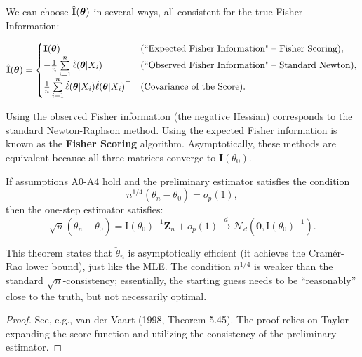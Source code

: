 We can choose $\hat{\mathbf{I}}(\boldsymbol{\boldsymbol{\theta}})$ in several ways, all consistent for the true Fisher Information:

\begin{equation}
\hat{\mathbf{I}}(\boldsymbol{\theta}) = \begin{cases}
        \mathbf{I}(\boldsymbol{\theta}) & \text{(``Expected Fisher Information" -- Fisher Scoring)}, \\
        -\frac{1}{n} \sum\limits_{i=1}^{n} \ddot{\ell}(\boldsymbol{\theta}|X_i) & \text{(``Observed Fisher Information" -- Standard Newton)}, \\
        \frac{1}{n} \sum\limits_{i=1}^{n} \dot{\ell}(\boldsymbol{\theta}|X_i) \dot{\ell}(\boldsymbol{\theta}|X_i)^\top & \text{(Covariance of the Score)}.
\end{cases}
\end{equation}

\begin{remark}
    Using the observed Fisher information (the negative Hessian) corresponds to the standard Newton-Raphson method. Using the expected Fisher information is known as the \textbf{Fisher Scoring} algorithm. Asymptotically, these methods are equivalent because all three matrices converge to $\mathbf{I}(\theta_0)$.
\end{remark}

\begin{theo}
\label{theo:OneStep}
If assumptions A0-A4 hold and the preliminary estimator satisfies the condition
\[ n^{1/4}(\bar{\theta}_n - \theta_0) = o_p(1), \]
then the one-step estimator satisfies:
\[ \sqrt{n}(\check{\theta}_n-\theta_0) = \mathrm{I}(\theta_0)^{-1} \mathbf{Z}_n + o_p(1) \stackrel{d}{\longrightarrow} \mathcal{N}_d(\mathbf{0},\mathrm{I}(\theta_0)^{-1}). \]
\end{theo}

This theorem states that $\check{\theta}_n$ is asymptotically efficient (it achieves the Cramér-Rao lower bound), just like the MLE. The condition $n^{1/4}$ is weaker than the standard $\sqrt{n}$-consistency; essentially, the starting guess needs to be ``reasonably'' close to the truth, but not necessarily optimal.

\begin{proof}
    See, e.g., van der Vaart (1998, Theorem 5.45). The proof relies on Taylor expanding the score function and utilizing the consistency of the preliminary estimator.
\end{proof}

\medskip

